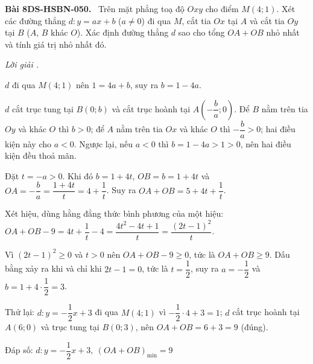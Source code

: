 \documentclass[12pt,a4paper]{article}
\newenvironment{problem}[1][]{\par\medskip\noindent\textbf{Bài #1.}\ }{\par}
\newenvironment{solution}[1][]{\par\noindent\textit{Lời giải #1.}\par}{\par}
\begin{document}
\begin{problem}[8DS-HSBN-050]
Trên mặt phẳng toạ độ $Oxy$ cho điểm $M(4; 1)$. Xét các đường thẳng $d\colon y = ax + b$ ($a \neq 0$) đi qua $M$, cắt tia $Ox$ tại $A$ và cắt tia $Oy$ tại $B$ ($A$, $B$ khác $O$). Xác định đường thẳng $d$ sao cho tổng $OA + OB$ nhỏ nhất và tính giá trị nhỏ nhất đó.

\begin{solution}
$d$ đi qua $M(4; 1)$ nên $1 = 4a + b$, suy ra $b = 1 - 4a$.

$d$ cắt trục tung tại $B(0; b)$ và cắt trục hoành tại $A\left(-\dfrac{b}{a}; 0\right)$. Để $B$ nằm trên tia $Oy$ và khác $O$ thì $b > 0$; để $A$ nằm trên tia $Ox$ và khác $O$ thì $-\dfrac{b}{a} > 0$; hai điều kiện này cho $a < 0$. Ngược lại, nếu $a < 0$ thì $b = 1 - 4a > 1 > 0$, nên hai điều kiện đều thoả mãn.

Đặt $t = -a > 0$. Khi đó $b = 1 + 4t$, $OB = b = 1 + 4t$ và $OA = -\dfrac{b}{a} = \dfrac{1 + 4t}{t} = 4 + \dfrac{1}{t}$. Suy ra $OA + OB = 5 + 4t + \dfrac{1}{t}$.

Xét hiệu, dùng hằng đẳng thức bình phương của một hiệu: $OA + OB - 9 = 4t + \dfrac{1}{t} - 4 = \dfrac{4t^2 - 4t + 1}{t} = \dfrac{(2t - 1)^2}{t}$.

Vì $(2t - 1)^2 \geq 0$ và $t > 0$ nên $OA + OB - 9 \geq 0$, tức là $OA + OB \geq 9$. Dấu bằng xảy ra khi và chỉ khi $2t - 1 = 0$, tức là $t = \dfrac{1}{2}$, suy ra $a = -\dfrac{1}{2}$ và $b = 1 + 4 \cdot \dfrac{1}{2} = 3$.

Thử lại: $d\colon y = -\dfrac{1}{2}x + 3$ đi qua $M(4; 1)$ vì $-\dfrac{1}{2} \cdot 4 + 3 = 1$; $d$ cắt trục hoành tại $A(6; 0)$ và trục tung tại $B(0; 3)$, nên $OA + OB = 6 + 3 = 9$ (đúng).

Đáp số: $\boxed{d\colon y = -\dfrac{1}{2}x + 3,\ (OA + OB)_{\min} = 9}$
\end{solution}
\end{problem}
\end{document}
